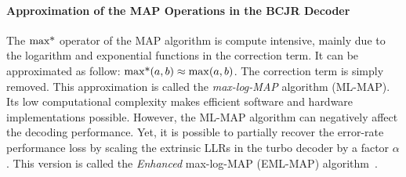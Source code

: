 

\paragraph{Approximation of the MAP Operations in the BCJR Decoder}


The $\operatorname*{max*}$ operator of the MAP algorithm is compute intensive, mainly due to
the logarithm and exponential functions in the correction term. It can be
approximated as follow: $\operatorname*{max*}(a,b) \approx \max(a,b)$. The correction term
is simply removed. This approximation is called the \emph{max-log-MAP} algorithm
(ML-MAP). Its low computational complexity makes efficient software and hardware
implementations possible. However, the ML-MAP algorithm can negatively affect
the decoding performance. Yet, it is possible to partially recover the
error-rate performance loss by scaling the extrinsic LLRs in the turbo decoder
by a factor $\alpha$. This version is called the \emph{Enhanced} max-log-MAP
(EML-MAP) algorithm~\cite{Vogt2000,Studer2011}.

